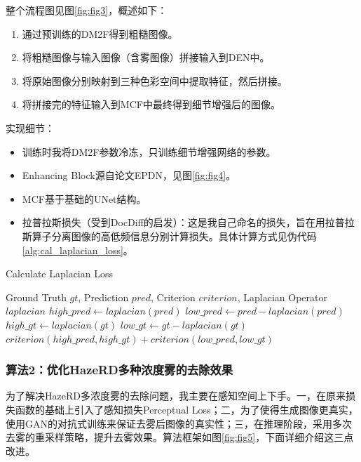 \documentclass{article}
\begin{document}
整个流程图见图\ref{fig:fig3}，概述如下：
\begin{enumerate}
  \item 通过预训练的DM2F得到粗糙图像。
  \item 将粗糙图像与输入图像（含雾图像）拼接输入到DEN中。
  \item 将原始图像分别映射到三种色彩空间中提取特征，然后拼接。
  \item 将拼接完的特征输入到MCF中最终得到细节增强后的图像。
\end{enumerate}

实现细节：
\begin{itemize}
  \item 训练时我将DM2F参数冷冻，只训练细节增强网络的参数。
  \item Enhancing Block源自论文EPDN\cite{qu2019enhanced}，见图\ref{fig:fig4}。
  \item MCF基于基础的UNet结构。
  \item 拉普拉斯损失（受到DocDiff\cite{yang2023docdiff}的启发）：这是我自己命名的损失，旨在用拉普拉斯算子分离图像的高低频信息分别计算损失。具体计算方式见伪代码\ref{alg:cal_laplacian_loss}。
\end{itemize}

\begin{algorithm}
  \caption{Calculate Laplacian Loss}
  \label{alg:cal_laplacian_loss}
  \begin{algorithmic}[1]
  \REQUIRE Ground Truth $gt$, Prediction $pred$, Criterion $criterion$, Laplacian Operator $laplacian$
  \STATE $high\_pred \leftarrow laplacian(pred)$
  \STATE $low\_pred \leftarrow pred - laplacian(pred)$
  \STATE $high\_gt \leftarrow laplacian(gt)$
  \STATE $low\_gt \leftarrow gt - laplacian(gt)$
  \RETURN $criterion(high\_pred, high\_gt) + criterion(low\_pred, low\_gt)$
  \end{algorithmic}
  \end{algorithm}

\subsubsection{算法2：优化HazeRD多种浓度雾的去除效果}
为了解决HazeRD多浓度雾的去除问题，我主要在感知空间上下手。一，在原来损失函数的基础上引入了感知损失Perceptual Loss；二，为了使得生成图像更真实，使用GAN的对抗式训练来保证去雾后图像的真实性；三，在推理阶段，采用多次去雾的重采样策略，提升去雾效果。算法框架如图\ref{fig:fig5}，下面详细介绍这三点改进。
\end{document}
